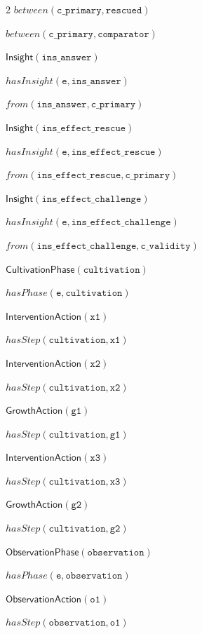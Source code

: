 \documentclass[10pt,a4paper]{article}
\begin{document}
{\begin{multicols}{2}
$\mathit{between}(\mathtt{c\_primary}, \mathtt{rescued})$\par
$\mathit{between}(\mathtt{c\_primary}, \mathtt{comparator})$\par
$\mathsf{Insight}(\mathtt{ins\_answer})$\par
$\mathit{hasInsight}(\mathtt{e}, \mathtt{ins\_answer})$\par
$\mathit{from}(\mathtt{ins\_answer}, \mathtt{c\_primary})$\par
$\mathsf{Insight}(\mathtt{ins\_effect\_rescue})$\par
$\mathit{hasInsight}(\mathtt{e}, \mathtt{ins\_effect\_rescue})$\par
$\mathit{from}(\mathtt{ins\_effect\_rescue}, \mathtt{c\_primary})$\par
$\mathsf{Insight}(\mathtt{ins\_effect\_challenge})$\par
$\mathit{hasInsight}(\mathtt{e}, \mathtt{ins\_effect\_challenge})$\par
$\mathit{from}(\mathtt{ins\_effect\_challenge}, \mathtt{c\_validity})$\par
$\mathsf{CultivationPhase}(\mathtt{cultivation})$\par
$\mathit{hasPhase}(\mathtt{e}, \mathtt{cultivation})$\par
$\mathsf{InterventionAction}(\mathtt{x1})$\par
$\mathit{hasStep}(\mathtt{cultivation}, \mathtt{x1})$\par
$\mathsf{InterventionAction}(\mathtt{x2})$\par
$\mathit{hasStep}(\mathtt{cultivation}, \mathtt{x2})$\par
$\mathsf{GrowthAction}(\mathtt{g1})$\par
$\mathit{hasStep}(\mathtt{cultivation}, \mathtt{g1})$\par
$\mathsf{InterventionAction}(\mathtt{x3})$\par
$\mathit{hasStep}(\mathtt{cultivation}, \mathtt{x3})$\par
$\mathsf{GrowthAction}(\mathtt{g2})$\par
$\mathit{hasStep}(\mathtt{cultivation}, \mathtt{g2})$\par
$\mathsf{ObservationPhase}(\mathtt{observation})$\par
$\mathit{hasPhase}(\mathtt{e}, \mathtt{observation})$\par
$\mathsf{ObservationAction}(\mathtt{o1})$\par
$\mathit{hasStep}(\mathtt{observation}, \mathtt{o1})$\par

\end{multicols}}
\end{document}
